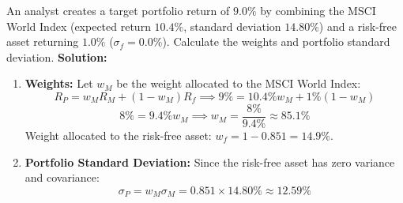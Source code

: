 \begin{tcolorbox}[
	colback=gray!5!white,
	colframe=black!15!white,
	boxrule=0.5pt,
	arc=3pt,
	title=\textbf{Example 12: Capital Allocation Weights},
	coltitle=black,
	colbacktitle=black!5!white,
	before skip=6pt,
	after skip=6pt,
	breakable
]
An analyst creates a target portfolio return of $9.0\%$ by combining the MSCI World Index (expected return $10.4\%$, standard deviation $14.80\%$) and a risk-free asset returning $1.0\%$ ($\sigma_f = 0.0\%$).
Calculate the weights and portfolio standard deviation.
\textbf{Solution:}
\begin{enumerate}
	\item \textbf{Weights:} Let $w_M$ be the weight allocated to the MSCI World Index:
	      \[
	      R_P = w_M R_M + (1 - w_M) R_f \implies 9\% = 10.4\% w_M + 1\%(1 - w_M)
	      \]
	      \[
	      8\% = 9.4\% w_M \implies w_M = \frac{8\%}{9.4\%} \approx 85.1\%
	      \]
	      Weight allocated to the risk-free asset: $w_f = 1 - 0.851 = 14.9\%$.
	\item \textbf{Portfolio Standard Deviation:} Since the risk-free asset has zero variance and covariance:
	      \[
	      \sigma_P = w_M \sigma_M = 0.851 \times 14.80\% \approx 12.59\%
	      \]
\end{enumerate}
\end{tcolorbox}

